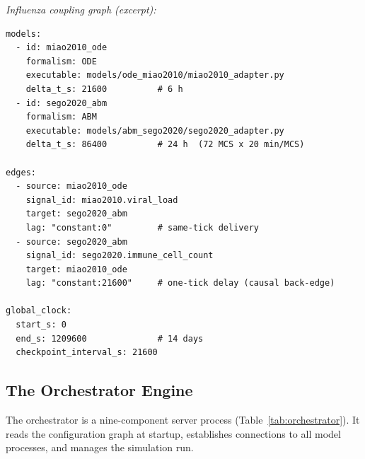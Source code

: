 \documentclass[conference,letterpaper,10pt]{IEEEtran}
\begin{document}
\noindent\textit{Influenza coupling graph (excerpt):}
\begin{lstlisting}[language=yamlconf]
models:
  - id: miao2010_ode
    formalism: ODE
    executable: models/ode_miao2010/miao2010_adapter.py
    delta_t_s: 21600          # 6 h
  - id: sego2020_abm
    formalism: ABM
    executable: models/abm_sego2020/sego2020_adapter.py
    delta_t_s: 86400          # 24 h  (72 MCS x 20 min/MCS)

edges:
  - source: miao2010_ode
    signal_id: miao2010.viral_load
    target: sego2020_abm
    lag: "constant:0"         # same-tick delivery
  - source: sego2020_abm
    signal_id: sego2020.immune_cell_count
    target: miao2010_ode
    lag: "constant:21600"     # one-tick delay (causal back-edge)

global_clock:
  start_s: 0
  end_s: 1209600              # 14 days
  checkpoint_interval_s: 21600
\end{lstlisting}

\subsection{The Orchestrator Engine}\label{sec:orchestrator}
The orchestrator is a nine-component server process
(Table~\ref{tab:orchestrator}). It reads the configuration graph at
startup, establishes connections to all model processes, and manages
the simulation run.
\end{document}

